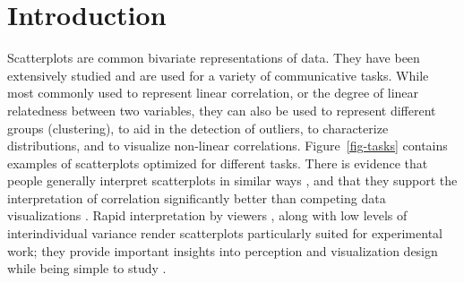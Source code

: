 \documentclass[manuscript, review, anonymous, screen]{acmart}
\begin{document}


\maketitle

\setlength{\parskip}{-0.1pt}

\hypertarget{introduction}{%
\section{Introduction}\label{introduction}}

Scatterplots are common bivariate representations of data. They have
been extensively studied and are used for a variety of communicative
tasks. While most commonly used to represent linear correlation, or the
degree of linear relatedness between two variables, they can also be
used to represent different groups (clustering), to aid in the detection
of outliers, to characterize distributions, and to visualize non-linear
correlations. Figure~\ref{fig-tasks} contains examples of scatterplots
optimized for different tasks. There is evidence that people generally
interpret scatterplots in similar ways \citep{kay_2015}, and that they
support the interpretation of correlation significantly better than
competing data visualizations \citep{li_2010}. Rapid interpretation by
viewers \citep{rensink_2014}, along with low levels of interindividual
variance render scatterplots particularly suited for experimental work;
they provide important insights into perception and visualization design
while being simple to study \citep{rensink_2014}.
\end{document}

